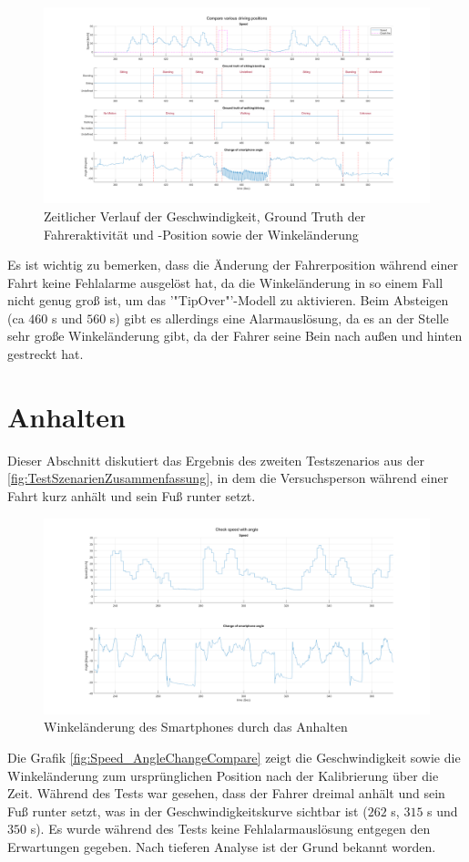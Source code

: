 \begin{figure}[H]
	\centering
	\includegraphics[width=\linewidth]{Bilder/Speed_Groundtruth_WalkStand_Compare.png}
	\caption{Zeitlicher Verlauf der Geschwindigkeit, Ground Truth der Fahreraktivität und -Position sowie der Winkeländerung}
	\label{fig:Speed_Groundtruth_WalkStand_Compare}
\end{figure}

Es ist wichtig zu bemerken, dass die Änderung der Fahrerposition während einer Fahrt keine Fehlalarme ausgelöst hat, da die Winkeländerung in so einem Fall nicht genug groß ist, um das '"TipOver"'-Modell zu aktivieren. Beim Absteigen (ca $460$ s und $560$ s) gibt es allerdings eine Alarmauslösung, da es an der Stelle sehr große Winkeländerung gibt, da der Fahrer seine Bein nach außen und hinten gestreckt hat.
\section{Anhalten}
Dieser Abschnitt diskutiert das Ergebnis des zweiten Testszenarios aus der \autoref{fig:TestSzenarienZusammenfassung}, in dem die Versuchsperson während einer Fahrt kurz anhält und sein Fuß runter setzt.

\begin{figure}
	\centering
	\includegraphics[width=\linewidth]{Bilder/Speed_AngleChangeCompare.png}
	\caption{Winkeländerung des Smartphones durch das Anhalten}
	\label{fig:Speed_AngleChangeCompare}
\end{figure}
Die Grafik \autoref{fig:Speed_AngleChangeCompare} zeigt die Geschwindigkeit sowie die Winkeländerung zum ursprünglichen Position nach der Kalibrierung über die Zeit.
Während des Tests war gesehen, dass der Fahrer dreimal anhält und sein Fuß runter setzt, was in der Geschwindigkeitskurve sichtbar ist ($262$ s, $315$ s und $350$ s). Es wurde während des Tests keine Fehlalarmauslösung entgegen den Erwartungen gegeben. Nach tieferen Analyse ist der Grund bekannt worden.

